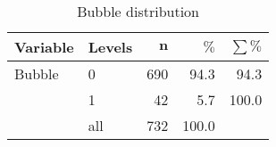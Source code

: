 \begin{table}[ht]
\centering
\begingroup\normalsize
\begin{tabular}{ll|rrr}
 \textbf{Variable} & \textbf{Levels} & $\mathbf{n}$ & $\mathbf{\%}$ & $\mathbf{\sum \%}$ \\ 
  \hline
Bubble & 0 & 690 & 94.3 & 94.3 \\ 
   & 1 & 42 & 5.7 & 100.0 \\ 
   \hline
 & all & 732 & 100.0 &  \\ 
   \hline
\hline
\end{tabular}
\endgroup
\caption{Bubble distribution} 
\label{tab:imbalance}
\end{table}
